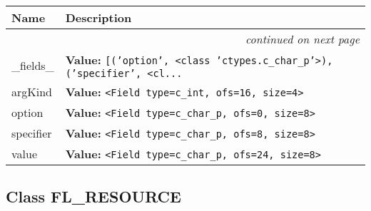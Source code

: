     \vspace{-1cm}
\hspace{\varindent}\begin{longtable}{|p{\varnamewidth}|p{\vardescrwidth}|l}
\cline{1-2}
\cline{1-2} \centering \textbf{Name} & \centering \textbf{Description}& \\
\cline{1-2}
\endhead\cline{1-2}\multicolumn{3}{r}{\small\textit{continued on next page}}\\\endfoot\cline{1-2}
\endlastfoot\raggedright \_\-f\-i\-e\-l\-d\-s\-\_\- & \raggedright \textbf{Value:} 
{\tt \texttt{[}\texttt{(}\texttt{'}\texttt{option}\texttt{'}\texttt{, }{\textless}class 'ctypes.c\_char\_p'{\textgreater}\texttt{)}\texttt{, }\texttt{(}\texttt{'}\texttt{specifier}\texttt{'}\texttt{, }{\textless}cl\texttt{...}}&\\
\cline{1-2}
\raggedright a\-r\-g\-K\-i\-n\-d\- & \raggedright \textbf{Value:} 
{\tt {\textless}Field type=c\_int, ofs=16, size=4{\textgreater}}&\\
\cline{1-2}
\raggedright o\-p\-t\-i\-o\-n\- & \raggedright \textbf{Value:} 
{\tt {\textless}Field type=c\_char\_p, ofs=0, size=8{\textgreater}}&\\
\cline{1-2}
\raggedright s\-p\-e\-c\-i\-f\-i\-e\-r\- & \raggedright \textbf{Value:} 
{\tt {\textless}Field type=c\_char\_p, ofs=8, size=8{\textgreater}}&\\
\cline{1-2}
\raggedright v\-a\-l\-u\-e\- & \raggedright \textbf{Value:} 
{\tt {\textless}Field type=c\_char\_p, ofs=24, size=8{\textgreater}}&\\
\cline{1-2}
\end{longtable}



\subsection{Class FL\_RESOURCE}


